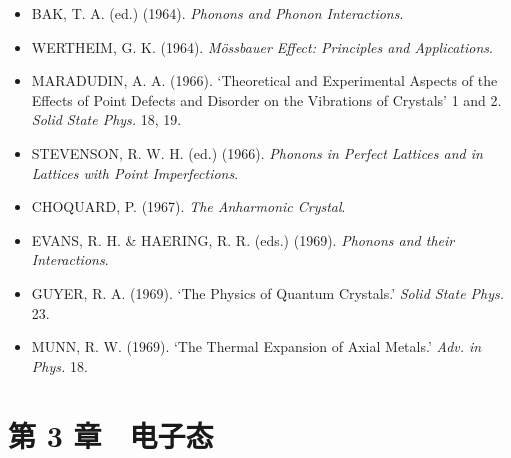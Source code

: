 \begin{itemize}[leftmargin=2em, itemsep=0.2em]
\item BAK, T. A. (ed.) (1964). \emph{Phonons and Phonon Interactions}.
\item WERTHEIM, G. K. (1964). \emph{Mössbauer Effect: Principles and Applications}.
\item MARADUDIN, A. A. (1966). `Theoretical and Experimental Aspects of the Effects of Point Defects and Disorder on the Vibrations of Crystals' 1 and 2. \emph{Solid State Phys.} 18, 19.
\item STEVENSON, R. W. H. (ed.) (1966). \emph{Phonons in Perfect Lattices and in Lattices with Point Imperfections}.
\item CHOQUARD, P. (1967). \emph{The Anharmonic Crystal}.
\item EVANS, R. H. \& HAERING, R. R. (eds.) (1969). \emph{Phonons and their Interactions}.
\item GUYER, R. A. (1969). `The Physics of Quantum Crystals.' \emph{Solid State Phys.} 23.
\item MUNN, R. W. (1969). `The Thermal Expansion of Axial Metals.' \emph{Adv. in Phys.} 18.
\end{itemize}

\section*{第 3 章　电子态}

